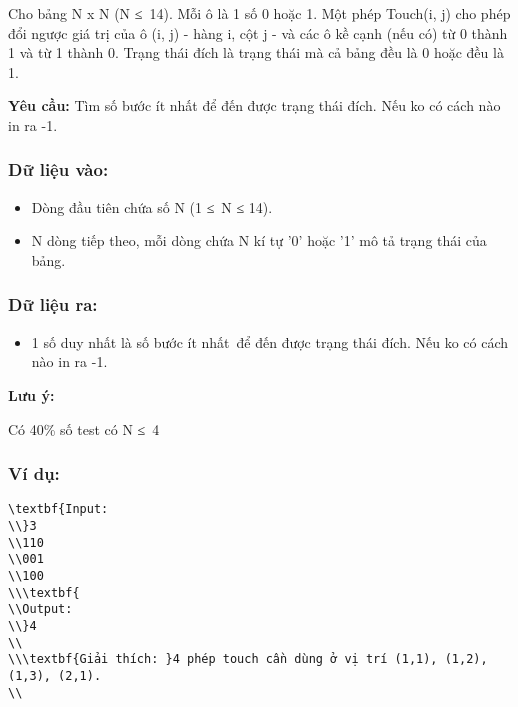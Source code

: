 



   Cho bảng N x N (N ≤ 14). Mỗi ô là 1 số 0 hoặc 1. Một phép Touch(i, j) cho phép đổi ngược giá trị của ô (i, j) - hàng i, cột j - và các ô kề cạnh (nếu có) từ 0 thành 1 và từ 1 thành 0. Trạng thái đích là trạng thái mà cả bảng đều là 0 hoặc đều là 1.  

\textbf{    Yêu cầu:   }   Tìm số bước ít nhất để đến được trạng thái đích. Nếu ko có cách nào in ra -1.  

\subsubsection{\textbf{    Dữ liệu vào:   }}
\begin{itemize}
	\item     Dòng đầu tiên chứa số N (1 ≤ N ≤ 14).   
	\item     N dòng tiếp theo, mỗi dòng chứa N kí tự '0' hoặc '1' mô tả trạng thái của bảng.   
\end{itemize}

\subsubsection{   Dữ liệu ra:  }
\begin{itemize}
	\item     1 số duy nhất là số bước ít nhất để đến được trạng thái đích. Nếu ko có cách nào in ra -1.   
\end{itemize}

\textbf{     Lưu ý:    }

    Có 40\% số test có N ≤ 4   

\subsubsection{   Ví dụ:  }
\begin{verbatim}
\textbf{Input:
\\}3
\\110 
\\001
\\100
\\\textbf{
\\Output:
\\}4
\\
\\\textbf{Giải thích: }4 phép touch cần dùng ở vị trí (1,1), (1,2), (1,3), (2,1).
\\\end{verbatim}